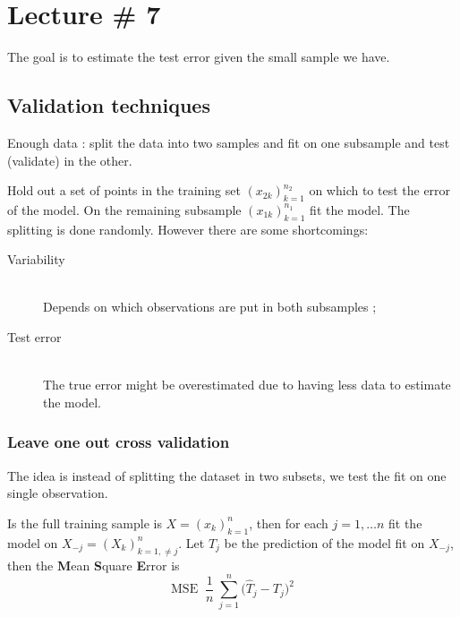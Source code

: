 \documentclass[a4paper]{article}
\newcommand{\brac}[1]{{\left ( #1 \right )}}
\newcommand{\defn}{\mathop{\overset{\Delta}{=}}\nolimits}
\begin{document}



\clearpage
\section{Lecture \# 7} %
\label{sec:lecture_7}

The goal is to estimate the test error given the small sample we have.

\subsection{Validation techniques} %
\label{sub:validation_techniques}

Enough data : split the data into two samples and fit on one subsample and test (validate) in the other.

Hold out a set of points in the training set $\brac{x_{2k}}_{k=1}^{n_2}$ on which to test the error of the model.
On the remaining subsample $\brac{x_{1k}}_{k=1}^{n_1}$ fit the model. The splitting is done randomly.
However there are some shortcomings:
\begin{description}
	\item[Variability] \hfill\\
		Depends on which observations are put in both subsamples ;
	\item[Test error] \hfill\\
		The true error might be overestimated due to having less data to estimate the model.
\end{description}

\subsubsection{Leave one out cross validation} %
\label{ssub:leave_one_out_cross_validation}

The idea is instead of splitting the dataset in two subsets, we test the fit on one single observation.

Is the full training sample is $X=\brac{x_k}_{k=1}^n$, then for each $j=1,\ldots n$ fit the model on $X_{-j} = \brac{X_k}_{k=1,\neq j}^n$.
Let $\hat{T}_j$ be the prediction of the model fit on $X_{-j}$, then the \textbf{M}ean \textbf{S}quare \textbf{E}rror is 
\[\text{MSE} \defn \frac{1}{n}\ \sum_{j=1}^n \big(\hat{T}_j - T_j\big)^2 \]
\end{document}
